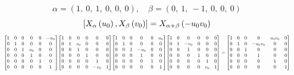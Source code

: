 \documentclass[11pt]{article}
\theoremstyle{definition}
\begin{document}
\[
\alpha = \left( 1, \  0, \  1, \  0, \  0, \  0\right), \quad \beta = \left( 0, \  1, \  -1, \  0, \  0, \  0\right)
\]
\[
\scaletoalign{\textwidth}{\left[ X_{\alpha}\left(u_{0}\right), X_{\beta}\left(v_{0}\right) \right] = X_{\alpha + \beta}\left(- u_{0} v_{0}\right)}
\]
\[
\scaletoalign{\textwidth}{{\left[\begin{matrix}1 & 0 & 0 & 0 & 0 & - u_{0}\\0 & 1 & 0 & 0 & 0 & 0\\0 & 0 & 1 & u_{0} & 0 & 0\\0 & 0 & 0 & 1 & 0 & 0\\0 & 0 & 0 & 0 & 1 & 0\\0 & 0 & 0 & 0 & 0 & 1\end{matrix}\right]} {\left[\begin{matrix}1 & 0 & 0 & 0 & 0 & 0\\0 & 1 & v_{0} & 0 & 0 & 0\\0 & 0 & 1 & 0 & 0 & 0\\0 & 0 & 0 & 1 & 0 & 0\\0 & 0 & 0 & 0 & 1 & 0\\0 & 0 & 0 & 0 & - v_{0} & 1\end{matrix}\right]} {\left[\begin{matrix}1 & 0 & 0 & 0 & 0 & u_{0}\\0 & 1 & 0 & 0 & 0 & 0\\0 & 0 & 1 & - u_{0} & 0 & 0\\0 & 0 & 0 & 1 & 0 & 0\\0 & 0 & 0 & 0 & 1 & 0\\0 & 0 & 0 & 0 & 0 & 1\end{matrix}\right]} {\left[\begin{matrix}1 & 0 & 0 & 0 & 0 & 0\\0 & 1 & - v_{0} & 0 & 0 & 0\\0 & 0 & 1 & 0 & 0 & 0\\0 & 0 & 0 & 1 & 0 & 0\\0 & 0 & 0 & 0 & 1 & 0\\0 & 0 & 0 & 0 & v_{0} & 1\end{matrix}\right]} = {\left[\begin{matrix}1 & 0 & 0 & 0 & u_{0} v_{0} & 0\\0 & 1 & 0 & - u_{0} v_{0} & 0 & 0\\0 & 0 & 1 & 0 & 0 & 0\\0 & 0 & 0 & 1 & 0 & 0\\0 & 0 & 0 & 0 & 1 & 0\\0 & 0 & 0 & 0 & 0 & 1\end{matrix}\right]}}
\]
\end{document}

